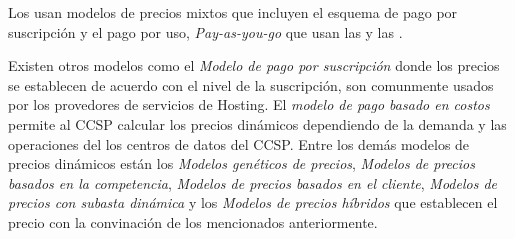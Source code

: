 Los  usan modelos de precios mixtos que incluyen el esquema de pago por suscripción y el pago por uso, \emph{Pay-as-you-go} que usan las  y las . \bigskip

Existen otros modelos como el \emph{Modelo de pago por suscripción} donde los precios se establecen de acuerdo con el nivel de la suscripción, son comunmente usados por los provedores de servicios de \gls{Hosting}. El \emph{modelo de pago basado en costos} permite al \acrshort{CCSP} calcular los precios dinámicos dependiendo de la demanda y las operaciones del los centros de datos del \acrshort{CCSP}. Entre los demás modelos de precios dinámicos están los \emph{Modelos genéticos de precios}, \emph{Modelos de precios basados en la competencia}, \emph{Modelos de precios basados en el cliente}, \emph{Modelos de precios con subasta dinámica} y los \emph{Modelos de precios híbridos} que establecen el precio con la convinación de los mencionados anteriormente.


